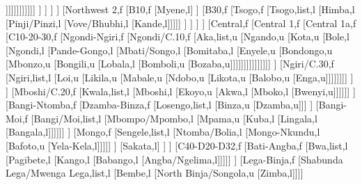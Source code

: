 \documentclass[landscape]{standalone}
\begin{document}
\begin{forest}
													[Samay,l
													[Ndambomo,l
													[Metombola,u]]]]]]]]]]]]
												]%
											]%
										]%
									]%
									[Northwest 2,f
										[B10,f
											[Myene,l]
										]%
										[B30,f
											[Tsogo,f
												[Tsogo,list,l
												[Himba,l
												[Pinji/Pinzi,l
												[Vove/Bhubhi,l
												[Kande,l]]]]]
											]%
										]%
									]%
								]%
								[Central,f
									[Central 1,f
										[Central 1a,f
											[C10-20-30,f
												[Ngondi-Ngiri,f
													[Ngondi/C.10,f
														[Aka,list,u
														[Ngando,u
														[Kota,u
														[Bole,l
														[Ngondi,l
														[Pande-Gongo,l
														[Mbati/Songo,l
														[Bomitaba,l
														[Enyele,u
														[Bondongo,u
														[Mbonzo,u
														[Bongili,u
														[Lobala,l
														[Bomboli,u
														[Bozaba,u]]]]]]]]]]]]]]]
													]%
													[Ngiri/C.30,f
														[Ngiri,list,l
														[Loi,u
														[Likila,u
														[Mabale,u
														[Ndobo,u
														[Likota,u
														[Balobo,u
														[Enga,u]]]]]]]]
													]%
												]%
												[Mboshi/C.20,f
													[Kwala,list,l
													[Mboshi,l
													[Ekoyo,u
													[Akwa,l
													[Mboko,l
													[Bwenyi,u]]]]]]
												]%
												[Bangi-Ntomba,f
													[Dzamba-Binza,f
														[Losengo,list,l
														[Binza,u
														[Dzamba,u]]]
													]%
													[Bangi-Moi,f
														[Bangi/Moi,list,l
														[Mbompo/Mpombo,l
														[Mpama,u
														[Kuba,l
														[Lingala,l
														[Bangala,l]]]]]]
													]%
													[Mongo,f
														[Sengele,list,l
														[Ntomba/Bolia,l
														[Mongo-Nkundu,l
														[Bafoto,u
														[Yela-Kela,l]]]]]
													]%
													[Sakata,l]
												]%
											]%
											[C40-D20-D32,f
												[Bati-Angba,f
													[Bwa,list,l
													[Pagibete,l
													[Kango,l
													[Babango,l
													[Angba/Ngelima,l]]]]]
												]%
												[Lega-Binja,f
													[Shabunda Lega/Mwenga Lega,list,l
													[Bembe,l
													[North Binja/Songola,u
													[Zimba,l]]]]

\end{forest}
\end{document}
